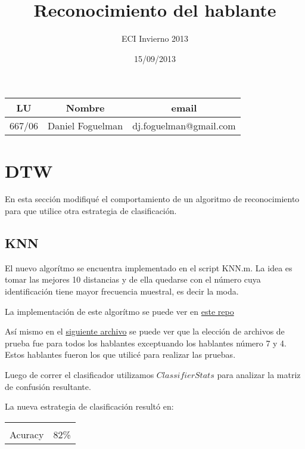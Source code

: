 \documentclass[a4paper,8pt]{article}
\title{Reconocimiento del hablante}
\author{ECI Invierno 2013}
\date{15/09/2013}
\begin{document}
\maketitle
\vspace{10cm}
\begin{center}

\begin{tabular}{|c|c|c|}
\hline
\hline
\textbf{LU}&\textbf{Nombre}&\textbf{email}\\
\hline
667/06&Daniel Foguelman &dj.foguelman@gmail.com\\
\hline
\hline
\end{tabular}
\end{center}
\newpage

\section{DTW}
En esta secci\'on modifiqu\'e el comportamiento de un algoritmo de reconocimiento para que utilice otra estrategia de clasificaci\'on.
\subsection{KNN}
El nuevo algor\'itmo se encuentra implementado en el script KNN.m. La idea es tomar las mejores 10 distancias y de ella quedarse con el n\'umero cuya identificaci\'on tiene mayor frecuencia muestral, es decir la moda.

La implementaci\'on de este algor\'itmo se puede ver en \href{https://github.com/dioh/asr/blob/master/punto_1/modelsTestKNN.m}{este repo}

As\'i mismo en el \href{https://github.com/dioh/asr/blob/master/punto_1/KNN.m}{siguiente archivo} se puede ver que la elecci\'on de archivos de prueba fue para todos los hablantes exceptuando los hablantes n\'umero 7 y 4. Estos hablantes fueron los que utilic\'e para realizar las pruebas.

Luego de correr el clasificador utilizamos $ClassifierStats$ para analizar la matriz de confusi\'on resultante.

La nueva estrategia de clasificaci\'on result\'o en:

\begin{center}
    
\begin{tabular}{l|r}
    \hline \\
    Acuracy & 82\%\\
\hline

\end{tabular}
    
\end{center}
\end{document}
